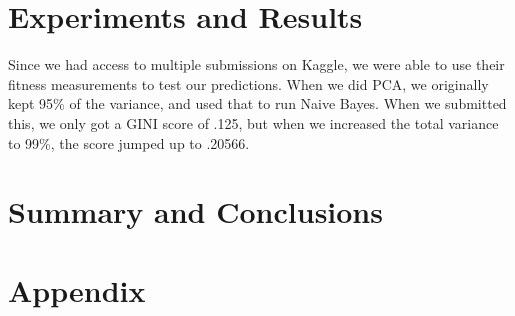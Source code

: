 \documentclass[fleqn,10pt]{SelfArx} %
\begin{document}
\section{Experiments and Results}
Since we had access to multiple submissions on Kaggle, we were able to use their fitness measurements to test our predictions. When we did PCA, we originally kept 95\% of the variance, and used that to run Naive Bayes. When we submitted this, we only got a GINI score of .125, but when we increased the total variance to 99\%, the score jumped up to .20566.  



\bigskip
\bigskip
\section{Summary and Conclusions}
\bigskip
\bigskip
\bigskip

\section{Appendix}
\end{document}
